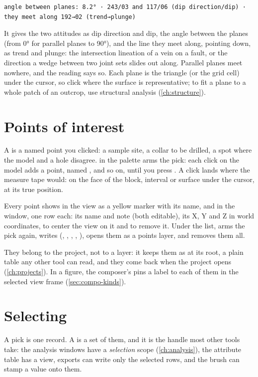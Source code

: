 \begin{lstlisting}
angle between planes: 8.2° · 243/03 and 117/06 (dip direction/dip) · they meet along 192→02 (trend→plunge)
\end{lstlisting}

It gives the two attitudes as dip direction and dip, the angle between the planes (from 0° for parallel planes to 90°), and the line they meet along, pointing down, as trend and plunge: the intersection lineation of a vein on a fault, or the direction a wedge between two joint sets slides out along. Parallel planes meet nowhere, and the reading says so. Each plane is the triangle (or the grid cell) under the cursor, so click where the surface is representative; to fit a plane to a whole patch of an outcrop, use structural analysis (\cref{ch:structure}).

\section{Points of interest}\label{sec:picking-poi}
A  is a named point you clicked: a sample site, a collar to be drilled, a spot where the model and a hole disagree.  in the palette arms the pick: each click on the model adds a point, named ,  and so on, until you press . A click lands where the measure tape would: on the face of the block, interval or surface under the cursor, at its true position.

Every point shows in the view as a yellow marker with its name, and in the  window, one row each: its name and note (both editable), its X, Y and Z in world coordinates,  to center the view on it and  to remove it. Under the list,  arms the pick again,  writes  (, , , , ),  opens them as a points layer, and  removes them all.

They belong to the project, not to a layer: it keeps them as  at its root, a plain table any other tool can read, and they come back when the project opens (\cref{ch:projects}). In a figure, the composer's  pins a label to each of them in the selected view frame (\cref{sec:compo-kinds}).

\section{Selecting}\label{sec:picking-select}
A pick is one record. A  is a set of them, and it is the handle most other tools take: the analysis windows have a \emph{selection} scope (\cref{ch:analysis}), the attribute table has a  view, exports can write only the selected rows, and the brush can stamp a value onto them.

